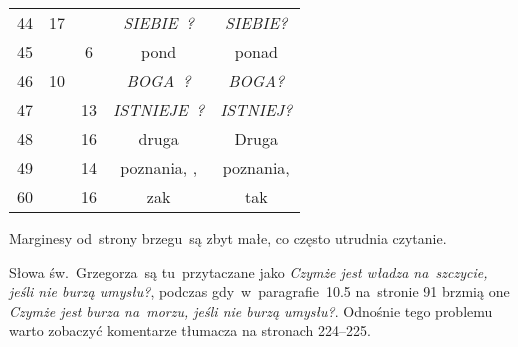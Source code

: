 \documentclass[a4paper,11pt]{article}
\begin{document}
\begin{center}
\begin{tabular}{|c|c|c|c|c|}
    44  & 17 & & \textit{SIEBIE~?} & \textit{SIEBIE?} \\
    45  & &  6 & pond & ponad \\
    46  & 10 & & \textit{BOGA~?} & \textit{BOGA?} \\
    47  & & 13 & \textit{ISTNIEJE~?} & \textit{ISTNIEJ?} \\
    48  & & 16 & druga & Druga \\
    49  & & 14 & poznania,{ }, & poznania, \\
    60  & & 16 & zak & tak \\
    \hline
  \end{tabular}

\end{center}

\vspace{\spaceTwo}













\newpage


\vspace{0em}



\vspace{0em}


\noindent
Marginesy od~strony brzegu~są zbyt małe, co często utrudnia czytanie.







\vspace{0em}


\noindent
{} Słowa św.~Grzegorza~są tu~przytaczane jako
\textit{Czymże jest władza na~szczycie, jeśli nie burzą umysłu?},
podczas gdy~w~paragrafie~10.5 na~stronie 91 brzmią one \textit{Czymże
  jest burza na~morzu, jeśli nie burzą umysłu?}. Odnośnie tego
problemu warto zobaczyć komentarze tłumacza na stronach 224--225.
\end{document}
